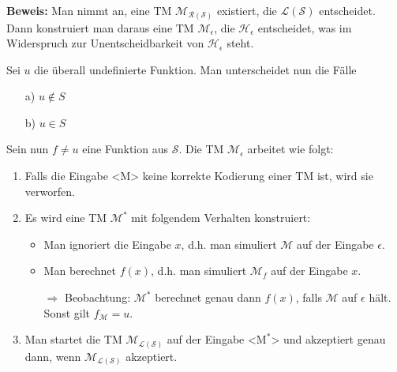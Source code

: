 \documentclass{scrartcl}%
\begin{document}
    \vspace*{0.3cm}
    \textbf{\textsf{Beweis:}} Man nimmt an, eine TM $\mathcal{M}_{\mathcal{R}(\mathcal{S})}$ existiert,
    die $\mathcal{L}(\mathcal{S})$ entscheidet.
    Dann konstruiert man daraus eine TM $\mathcal{M}_{\epsilon}$, die $\mathcal{H}_\epsilon$ entscheidet,
    was im Widerspruch zur Unentscheidbarkeit von $\mathcal{H}_\epsilon$ steht.

    \vspace*{0.3cm}
    Sei $u$ die überall undefinierte Funktion. Man unterscheidet nun die Fälle
    \begin{itemize}
        \item [a)] $u \notin S$
        \item [b)] $u \in S$
    \end{itemize}

    \newpage
    Sein nun $f \neq u$ eine Funktion aus $\mathcal{S}$. Die TM $\mathcal{M}_\epsilon$ arbeitet wie folgt:
    \begin{enumerate}
        \item Falls die Eingabe <M> keine korrekte Kodierung einer TM ist, wird sie verworfen.
        \item Es wird eine TM $\mathcal{M}^*$ mit folgendem Verhalten konstruiert:
        \begin{itemize}
            \item Man ignoriert die Eingabe $x$, d.h. man simuliert $\mathcal{M}$ auf der Eingabe $\epsilon$.
            \item Man berechnet $f(x)$, d.h. man simuliert $\mathcal{M}_f$ auf der Eingabe $x$.
            \item [$\Rightarrow$] Beobachtung: $\mathcal{M}^*$ berechnet genau dann $f(x)$,
            falls $\mathcal{M}$ auf $\epsilon$ hält. Sonst gilt $f_{\mathcal{M}} = u$.
        \end{itemize}
        \item Man startet die TM $\mathcal{M}_{\mathcal{L}(\mathcal{S})}$ auf der Eingabe <$\text{M}^*$> und akzeptiert genau dann,
        wenn $\mathcal{M}_{\mathcal{L}(\mathcal{S})}$ akzeptiert.
    \end{enumerate}
\end{document}
